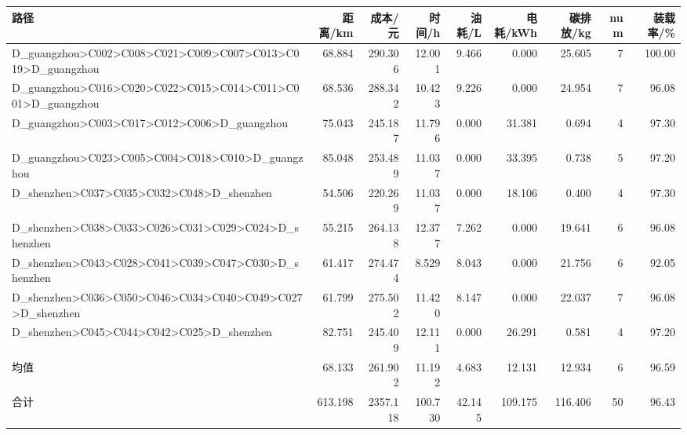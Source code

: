 \begin{tabular}{lrrrrrrrr}
\toprule
路径 & 距离/km & 成本/元 & 时间/h & 油耗/L & 电耗/kWh & 碳排放/kg & num & 装载率/\%  \\
\midrule
D_guangzhou>C002>C008>C021>C009>C007>C013>C019>D_guangzhou & 68.884 & 290.306 & 12.001 & 9.466 & 0.000 & 25.605 & 7 & 100.00 \\
D_guangzhou>C016>C020>C022>C015>C014>C011>C001>D_guangzhou & 68.536 & 288.342 & 10.423 & 9.226 & 0.000 & 24.954 & 7 & 96.08 \\
D_guangzhou>C003>C017>C012>C006>D_guangzhou & 75.043 & 245.187 & 11.796 & 0.000 & 31.381 & 0.694 & 4 & 97.30 \\
D_guangzhou>C023>C005>C004>C018>C010>D_guangzhou & 85.048 & 253.489 & 11.037 & 0.000 & 33.395 & 0.738 & 5 & 97.20 \\
D_shenzhen>C037>C035>C032>C048>D_shenzhen & 54.506 & 220.269 & 11.037 & 0.000 & 18.106 & 0.400 & 4 & 97.30 \\
D_shenzhen>C038>C033>C026>C031>C029>C024>D_shenzhen & 55.215 & 264.138 & 12.377 & 7.262 & 0.000 & 19.641 & 6 & 96.08 \\
D_shenzhen>C043>C028>C041>C039>C047>C030>D_shenzhen & 61.417 & 274.474 & 8.529 & 8.043 & 0.000 & 21.756 & 6 & 92.05 \\
D_shenzhen>C036>C050>C046>C034>C040>C049>C027>D_shenzhen & 61.799 & 275.502 & 11.420 & 8.147 & 0.000 & 22.037 & 7 & 96.08 \\
D_shenzhen>C045>C044>C042>C025>D_shenzhen & 82.751 & 245.409 & 12.111 & 0.000 & 26.291 & 0.581 & 4 & 97.20 \\
均值 & 68.133 & 261.902 & 11.192 & 4.683 & 12.131 & 12.934 & 6 & 96.59 \\
合计 & 613.198 & 2357.118 & 100.730 & 42.145 & 109.175 & 116.406 & 50 & 96.43 \\
\bottomrule
\end{tabular}
